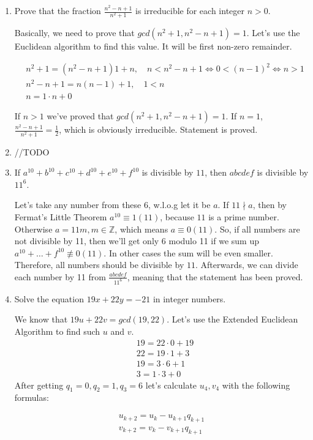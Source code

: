 \documentclass{article}
\begin{document}
\begin{enumerate}
\item Prove that the fraction $\frac{n^2-n+1}{n^2+1}$ is irreducible for each integer $n>0$.
\newline

Basically, we need to prove that $gcd(n^2+1,n^2-n+1)=1$. Let's use the Euclidean algorithm to find this value. It will be first non-zero remainder.

\begin{align*}
&n^2+1=(n^2-n+1)1 + n, \quad n < n^2-n+1 \iff 0 < (n-1)^2 \iff n > 1\\
&n^2-n+1=n(n-1)+1, \quad 1 < n\\
&n = 1 \cdot n + 0
\end{align*}

If $n>1$ we've proved that $gcd(n^2+1,n^2-n+1)=1$. If $n=1$, $\frac{n^2-n+1}{n^2+1}=\frac{1}{2}$, which is obviously irreducible. Statement is proved.

\item //TODO

\item If $a^{10} + b^{10} + c^{10} + d^{10} + e^{10} + f^{10}$ is divisible by $11$, then $abcdef$ is divisible by $11^6$.

Let's take any number from these $6$, w.l.o.g let it be $a$. If $11 \nmid a$, then by Fermat's Little Theorem $a^{10} \equiv 1(11)$, because $11$ is a prime number. Otherwise $a=11m, m \in \mathbb{Z}$, which means $a\equiv 0 (11)$. So, if all numbers are not divisible by 11, then we'll get only 6 modulo 11 if we sum up $a^{10} + \ldots + f^{10} \not\equiv 0 (11)$. In other cases the sum will be even smaller. Therefore, all numbers should be divisible by $11$. Afterwards, we can divide each number by 11 from $\frac{abcdef}{11^6}$, meaning that the statement has been proved.

\item Solve the equation $19x+22y=-21$ in integer numbers.
\newline

We know that $19u+22v=gcd(19,22)$. Let's use the Extended Euclidean Algorithm to find such $u$ and $v$.
\begin{align*}
&19=22\cdot0+19\\
&22=19\cdot1+3\\
&19=3\cdot6+1\\
&3=1\cdot3+0
\end{align*}
After getting $q_1=0, q_2=1, q_3=6$ let's calculate $u_4, v_4$ with the following formulas:

\begin{align*}
u_{k+2}=u_k-u_{k+1}q_{k+1}\\
v_{k+2}=v_k-v_{k+1}q_{k+1}\\
\end{align*}


\end{enumerate}
\end{document}
